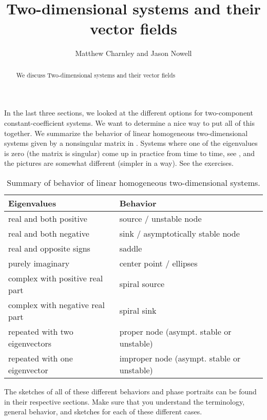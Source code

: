 \documentclass{ximera}
\title{Two-dimensional systems and their vector fields}
\author{Matthew Charnley and Jason Nowell}
\begin{document}
\begin{abstract}
    We discuss Two-dimensional systems and their vector fields
\end{abstract}
\maketitle

\label{sec:twodimaut}


In the last three sections, we looked at the different options for two-component constant-coefficient systems. We want to determine a nice way to put all of this together. We summarize the behavior of linear homogeneous two-dimensional systems given by a nonsingular matrix in . Systems where one of the eigenvalues is zero (the matrix is singular) come up in practice from time to time, see , and the pictures are somewhat different (simpler in a way).  See the exercises.

\begin{table}[h!t]
    \mybeginframe
    \capstart
    \begin{center}
        \begin{tabular}{@{}ll@{}}
            \toprule
            Eigenvalues & Behavior \\
            \midrule
            real and both positive & source / unstable node \\
            real and both negative & sink / asymptotically stable node \\
            real and opposite signs & saddle \\
            purely imaginary & center point / ellipses \\
            complex with positive real part & spiral source \\
            complex with negative real part & spiral sink \\
            repeated with two eigenvectors & proper node  (asympt. stable or unstable) \\
            repeated with one eigenvector & improper node (asympt. stable or unstable) \\
            \bottomrule
        \end{tabular}
    \end{center}
    \caption{Summary of behavior of linear homogeneous two-dimensional systems.\label{pln:behtab}}
    \myendframe
\end{table}

The sketches of all of these different behaviors and phase portraits can be found in their respective sections. Make sure that you understand the terminology, general behavior, and sketches for each of these different cases. 
\end{document}
